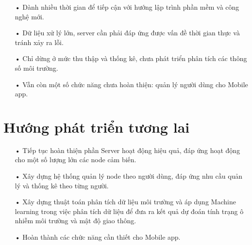 \begin{itemize}
\item[•] Dành nhiều thời gian để tiếp cận với hướng lập trình phần mềm và công nghệ mới.
\item[•] Dữ liệu xử lý lớn, server cần phải đáp ứng được vấn đề thời gian thực và tránh xảy ra lỗi.
\item[•] Chỉ dừng ở mức thu thập và thống kê, chưa phát triển phân tích các thông số môi trường.
\item[•] Vẫn còn một số chức năng chưa hoàn thiện: quản lý người dùng cho Mobile app.
\end{itemize}

\section{Hướng phát triển tương lai}
\begin{itemize}
\item[•]Tiếp tục hoàn thiện phần Server hoạt động hiệu quả, đáp ứng hoạt động cho một số lượng lớn các node cảm biến.
\item[•]Xây dựng hệ thống quản lý node theo người dùng, đáp ứng nhu cầu quản lý và thống kê theo từng người.
\item[•]Xây dựng thuật toán phân tích dữ liệu môi trường và áp dụng Machine learning trong việc phân tích dữ liệu để đưa ra kết quả dự đoán tính trạng ô nhiễm môi trường và mật độ giao thông.
\item[•]Hoàn thành các chức năng cần thiết cho Mobile app.
\end{itemize}
